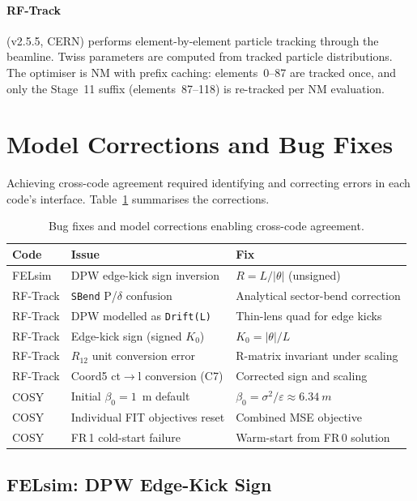 \documentclass[11pt]{article}
\begin{document}
\paragraph{RF-Track} (v2.5.5, CERN) performs element-by-element
particle tracking through the beamline.  Twiss parameters are computed
from tracked particle distributions.  The optimiser is NM with prefix
caching: elements~0--87 are tracked once, and only the Stage~11 suffix
(elements~87--118) is re-tracked per NM evaluation.


\section{Model Corrections and Bug Fixes}

Achieving cross-code agreement required identifying and correcting
errors in each code's interface.  Table~\ref{tab:fixes} summarises the
corrections.

\begin{table}[ht]
\centering
\caption{Bug fixes and model corrections enabling cross-code agreement.}
\label{tab:fixes}
\small
\begin{tabular}{@{} l l l @{}}
\toprule
Code & Issue & Fix \\
\midrule
FELsim     & DPW edge-kick sign inversion        & $R = L/|\theta|$ (unsigned) \\
RF-Track   & \texttt{SBend} P/$\delta$ confusion  & Analytical sector-bend correction \\
RF-Track   & DPW modelled as \texttt{Drift(L)}    & Thin-lens quad for edge kicks \\
RF-Track   & Edge-kick sign (signed $K_0$)        & $K_0 = |\theta|/L$ \\
RF-Track   & $R_{12}$ unit conversion error        & R-matrix invariant under scaling \\
RF-Track   & Coord5 ct$\to$l conversion (C7)      & Corrected sign and scaling \\
COSY       & Initial $\beta_0 = 1$~m default      & $\beta_0 = \sigma^2/\varepsilon \approx \SI{6.34}{m}$ \\
COSY       & Individual FIT objectives reset       & Combined MSE objective \\
COSY       & FR\,1 cold-start failure              & Warm-start from FR\,0 solution \\
\bottomrule
\end{tabular}
\end{table}


\subsection{FELsim: DPW Edge-Kick Sign}
\end{document}
